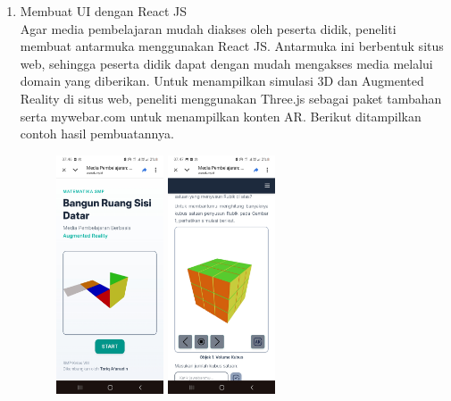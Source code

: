 \documentclass[12pt]{article}
\begin{document}
\begin{enumerate}[leftmargin=1cm, label=\arabic*.]
\begin{enumerate}[label=\arabic*)]
        \item Membuat UI dengan React JS \\
        \hspace*{1cm}Agar media pembelajaran mudah diakses oleh peserta didik, peneliti membuat antarmuka menggunakan React JS. Antarmuka ini berbentuk situs web, sehingga peserta didik dapat dengan mudah mengakses media melalui domain yang diberikan. Untuk menampilkan simulasi 3D dan Augmented Reality di situs web, peneliti menggunakan Three.js sebagai paket tambahan serta mywebar.com untuk menampilkan konten AR. Berikut ditampilkan contoh hasil pembuatannya.
        \begin{figure}[H]
            \centering
            \includegraphics[width=0.3\textwidth]{images/ui-1.jpg}
            \includegraphics[width=0.3\textwidth]{images/ui-2.jpg}

\end{figure}
\end{enumerate}
\end{enumerate}
\end{document}
